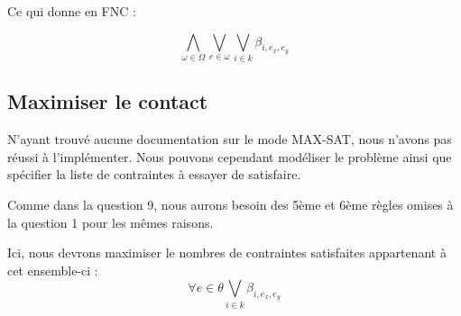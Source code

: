 \documentclass[a4paper]{article}
\begin{document}
Ce qui donne en FNC :

$$
\bigwedge_{\omega \in \Omega} \bigvee_{e \in \omega} \bigvee_{i \in k} \beta_{i, e_x, e_y}
$$



\subsection{Maximiser le contact}

N'ayant trouvé aucune documentation sur le mode MAX-SAT, nous n'avons pas réussi à l'implémenter.
Nous pouvons cependant modéliser le problème ainsi que spécifier la liste de contraintes à essayer de satisfaire.


Comme dans la question 9, nous aurons besoin des 5ème et 6ème règles omises à la question 1 pour les mêmes raisons.

Ici, nous devrons maximiser le nombres de contraintes satisfaites appartenant à cet ensemble-ci :
$$
  \forall e \in \theta \bigvee_{i \in k} \beta_{i, e_x, e_y}
$$
\end{document}
